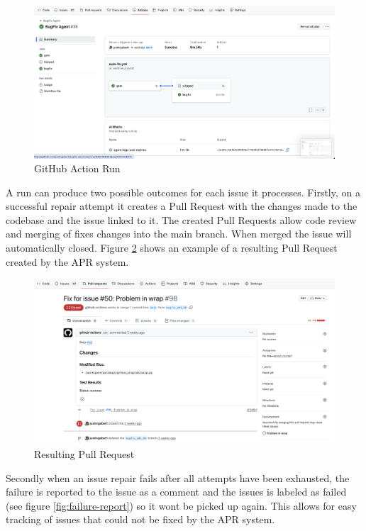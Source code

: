 \begin{figure}[H]
    \centering
    \includegraphics[width=1\textwidth]{images/workflow/Action.png}
    \caption{GitHub Action Run}
    \label{fig:apr-action}
\end{figure}

A run can produce two possible outcomes for each issue it processes. Firstly, on a successful repair attempt it creates a Pull Request with the changes made to the codebase and the issue linked to it. The created Pull Requests allow code review and merging of fixes changes into the main branch. When merged the issue will automatically closed. Figure \ref{fig:pr} shows an example of a resulting Pull Request created by the APR system.

\begin{figure}[H]
    \centering
    \includegraphics[width=1\textwidth]{images/workflow/PR.png}
    \caption{Resulting Pull Request}
    \label{fig:pr}
\end{figure}

Secondly when an issue repair fails after all attempts have been exhausted, the failure is reported to the issue as a comment and the issues is labeled as failed (see figure \ref{fig:failure-report}) so it wont be picked up again. This allows for easy tracking of issues that could not be fixed by the APR system.

